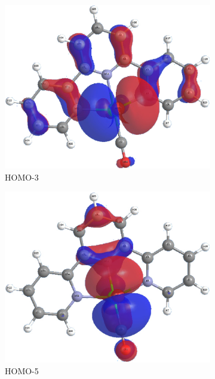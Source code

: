 \begin{figure}[!ht]
\begin{subfigure}[b]{0.31\textwidth}
  \includegraphics[clip=true, width=\textwidth, keepaspectratio]{images/mos/4h-3.eps}
  \caption{HOMO-3}
 \end{subfigure}
 \begin{subfigure}[b]{0.31\textwidth}
  \includegraphics[clip=true, width=\textwidth, keepaspectratio]{images/mos/4h-4.eps}
  \caption{HOMO-5}
 \end{subfigure}
 \begin{subfigure}[b]{0.31\textwidth}

\end{subfigure}
\end{figure}

